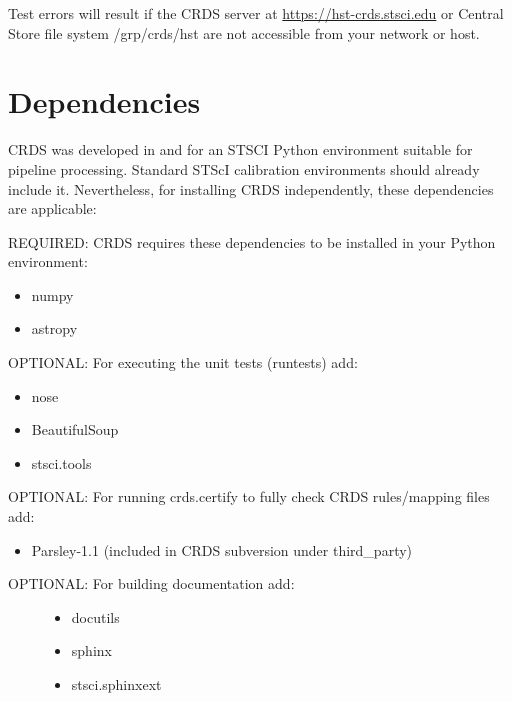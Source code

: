 \documentclass[letterpaper,10pt,english]{sphinxmanual}
\begin{document}
Test errors will result if the CRDS server at \href{https://hst-crds.stsci.edu}{https://hst-crds.stsci.edu} or Central Store
file system /grp/crds/hst are not accessible from your network or host.


\section{Dependencies}
\label{installation:dependencies}
CRDS was developed in and for an STSCI Python environment suitable for pipeline
processing.   Standard STScI calibration environments should already include it.
Nevertheless, for installing CRDS independently, these dependencies are applicable:

REQUIRED: CRDS requires these dependencies to be installed in your Python environment:
\begin{itemize}
\item {} 
numpy

\item {} 
astropy

\end{itemize}

OPTIONAL: For executing the unit tests (runtests) add:
\begin{itemize}
\item {} 
nose

\item {} 
BeautifulSoup

\item {} 
stsci.tools

\end{itemize}

OPTIONAL: For running crds.certify to fully check CRDS rules/mapping files add:
\begin{itemize}
\item {} 
Parsley-1.1  (included in CRDS subversion under third\_party)

\end{itemize}
\begin{description}
\item[{OPTIONAL: For building documentation add:}] \leavevmode\begin{itemize}
\item {} 
docutils

\item {} 
sphinx

\item {} 
stsci.sphinxext

\end{itemize}

\end{description}
\end{document}
